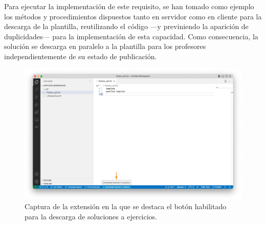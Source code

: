 \begin{itemize}
    Para ejecutar la implementación de este requisito, se han tomado como ejemplo los métodos y procedimientos dispuestos tanto en servidor como en cliente para la descarga de la plantilla, reutilizando el código ---y previniendo la aparición de duplicidades--- para la implementación de esta capacidad. Como consecuencia, la solución se descarga en paralelo a la plantilla para los profesores independientemente de su estado de publicación.
\end{itemize}

\begin{figure}[ht]
    \centering
    \includegraphics[width=\textwidth]{imagenes/utilizadas/4-3-implementacion/rf7-1.png}
    \caption{Captura de la extensión en la que se destaca el botón habilitado para la descarga de soluciones a ejercicios.}
    \label{fig:reqf7-1}
\end{figure}
